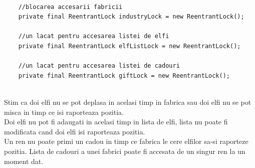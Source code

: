 \documentclass{article}
\begin{document}
\begin{lstlisting}

    //blocarea accesarii fabricii
    private final ReentrantLock industryLock = new ReentrantLock();
    
    //un lacat pentru accesarea listei de elfi
    private final ReentrantLock elfListLock = new ReentrantLock();
    
    //un lacat pentru accesarea listei de cadouri
    private final ReentrantLock giftLock = new ReentrantLock();
    
\end{lstlisting}
\vspace{5mm}
Stim ca doi elfi nu se pot deplasa in acelasi timp in fabrica sau doi elfi nu se pot misca in timp ce isi raporteaza pozitia.\\ \newline
Doi elfi nu pot fi adaugati in acelasi timp in lista de elfi, lista nu poate fi modificata cand doi elfi isi raporteaza pozitia.\\  \newline
Un ren nu poate primi un cadou in timp ce fabrica le cere elfilor sa-si raporteze pozitia. Lista de cadouri a unei fabrici poate fi accesata de un singur ren la un moment dat.\\
\end{document}
